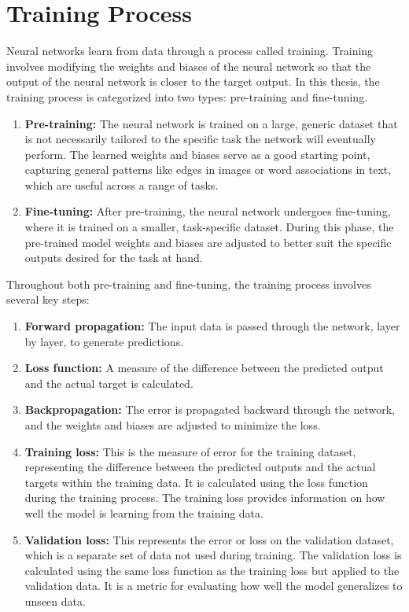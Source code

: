 \documentclass[english, ba, kiv, he, iso690numb, pdf, viewonly]{fasthesis}
\begin{document}
\section{Training Process}

Neural networks learn from data through a process called training. Training involves modifying the weights and biases of the neural network so that the output of the neural network is closer to the target output. In this thesis, the training process is categorized into two types: pre-training and fine-tuning.
\begin{enumerate}
    \item \textbf{Pre-training:} The neural network is trained on a large, generic dataset that is not necessarily tailored to the specific task the network will eventually perform. The learned weights and biases serve as a good starting point, capturing general patterns like edges in images or word associations in text, which are useful across a range of tasks.

    \item \textbf{Fine-tuning:} After pre-training, the neural network undergoes fine-tuning, where it is trained on a smaller, task-specific dataset. During this phase, the pre-trained model weights and biases are adjusted to better suit the specific outputs desired for the task at hand.
    
\end{enumerate}
Throughout both pre-training and fine-tuning, the training process involves several key steps:
\begin{enumerate}
    \item \textbf{Forward propagation:} The input data is passed through the network, layer by layer, to generate predictions.
    
    \item \textbf{Loss function:} A measure of the difference between the predicted output and the actual target is calculated.
    
    \item \textbf{Backpropagation:} The error is propagated backward through the network, and the weights and biases are adjusted to minimize the loss.

    \item \textbf{Training loss:} This is the measure of error for the training dataset, representing the difference between the predicted outputs and the actual targets within the training data. It is calculated using the loss function during the training process. The training loss provides information on how well the model is learning from the training data.

    \item \textbf{Validation loss:} This represents the error or loss on the validation dataset, which is a separate set of data not used during training. The validation loss is calculated using the same loss function as the training loss but applied to the validation data. It is a metric for evaluating how well the model generalizes to unseen data.
\end{enumerate}
\end{document}
